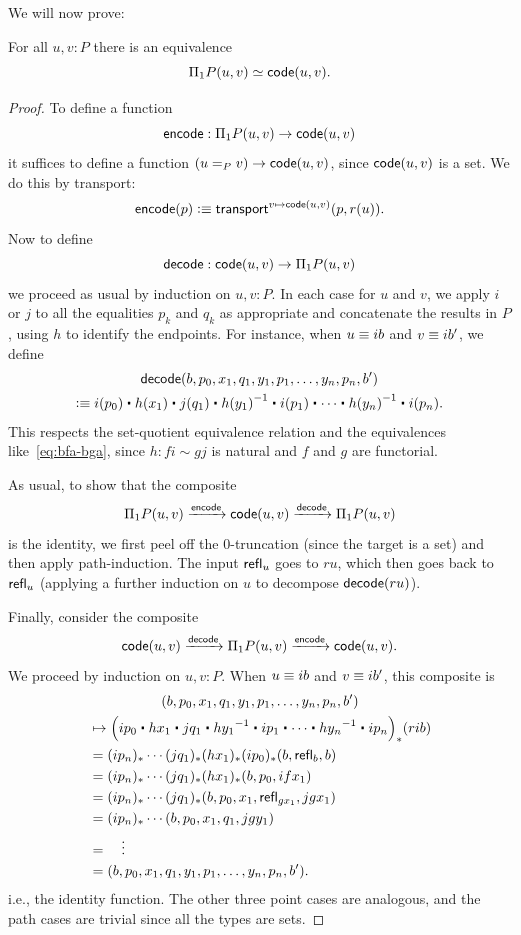 We will now prove:
\begin{thm}\label{thm:naive-van-kampen}
  For all $u,v:P$ there is an equivalence
  \[ \Pi_1P(u,v) \simeq \mathsf{code}(u,v). \]
\end{thm}
\begin{proof}

To define a function
\[ \mathsf{encode} : \Pi_1P(u,v) \to \mathsf{code}(u,v) \]
it suffices to define a function $(u=_P v) \to \mathsf{code}(u,v) $,
since $\mathsf{code}(u,v)$ is a set.
We do this by transport:
\[\mathsf{encode}(p) \vcentcolon\equiv \mathsf{transport}^{v\mapsto \mathsf{code}(u,v)}(p,r(u)).\]
Now to define
\[ \mathsf{decode}: \mathsf{code}(u,v) \to \Pi_1P(u,v) \]
we proceed as usual by induction on $u,v:P$.
In each case for $u$ and $v$, we apply $i$ or $j$ to all the equalities $p_k$ and $q_k$ as appropriate and concatenate the results in $P$, using $h$ to identify the endpoints.
For instance, when $u\equiv ib$ and $v\equiv ib'$, we define
\begin{multline}\label{eq:decode}
 \decode(b, p_0, x_1, q_1, y_1, p_1, \dots, y_n, p_n, b')\\
 \defeq i(p_0)\ct h(x_1) \ct j(q_1) \ct \opp{h(y_1)} \ct i(p_1) \ct \cdots \ct \opp{h(y_n)}\ct i(p_n).
\end{multline}
This respects the set-quotient equivalence relation and the equivalences like~\eqref{eq:bfa-bga}, since $h: fi \sim gj$ is natural and $f$ and $g$ are functorial.

As usual, to show that the composite
\[ \Pi_1P(u,v) \xrightarrow{\mathsf{encode}} \mathsf{code}(u,v) \xrightarrow{\mathsf{decode}} \Pi_1P(u,v) \]
is the identity, we first peel off the 0-truncation (since the target is a set) and then apply path-induction.
The input $\mathsf{refl}_{u}$ goes to $ru$, which then goes back to $\mathsf{refl}_{u}$ (applying a further induction on $u$ to decompose $\mathsf{decode}(ru)$).

Finally, consider the composite
\[  \mathsf{code}(u,v) \xrightarrow{\mathsf{decode}} \Pi_1P(u,v) \xrightarrow{\mathsf{encode}} \mathsf{code}(u,v). \]
We proceed by induction on $u,v:P$.
When $u\equiv ib$ and $v\equiv ib'$, this composite is
\begin{multline*}
(b, p_0, x_1, q_1, y_1, p_1, \dots, y_n, p_n, b')\\
\begin{split}
  &\mapsto \Big(ip_0\ct hx_1 \ct jq_1 \ct \opp{hy_1} \ct ip_1 \ct \cdots \ct \opp{hy_n}\ct ip_n\Big)_*(rib)\\
  &= (ip_n)_* \cdots(jq_1)_* (hx_1)_*(ip_0)_*(b,\refl{b},b)\\
  &= (ip_n)_* \cdots(jq_1)_* (hx_1)_*(b,p_0,ifx_1)\\
  &= (ip_n)_* \cdots(jq_1)_* (b,p_0,x_1,\refl{gx_1},jgx_1)\\
  &= (ip_n)_* \cdots (b,p_0,x_1,q_1,jgy_1)\\
  &= \quad\vdots\\
  &= (b, p_0, x_1, q_1, y_1, p_1, \dots, y_n, p_n, b').
\end{split}
\end{multline*}
i.e., the identity function.
The other three point cases are analogous, and the path cases are trivial since all the types are sets.
\end{proof}

